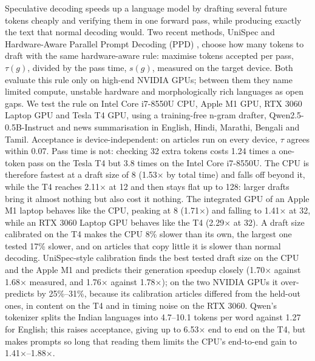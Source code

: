 \documentclass[11pt,a4paper]{article}
\begin{document}
\begin{titlepage}
\begin{minipage}{0.86\linewidth}
Speculative decoding speeds up a language model by drafting several future tokens cheaply and verifying them in one forward pass, while producing exactly the text that normal decoding would. Two recent methods, UniSpec \cite{unispec} and Hardware-Aware Parallel Prompt Decoding (PPD) \cite{ppd}, choose how many tokens to draft with the same hardware-aware rule: maximise tokens accepted per pass, $\tau(g)$, divided by the pass time, $s(g)$, measured on the target device. Both evaluate this rule only on high-end NVIDIA GPUs; between them they name limited compute, unstable hardware and morphologically rich languages as open gaps. We test the rule on Intel Core i7-8550U CPU, Apple M1 GPU, RTX 3060 Laptop GPU and Tesla T4 GPU, using a training-free n-gram drafter, Qwen2.5-0.5B-Instruct and news summarisation in English, Hindi, Marathi, Bengali and Tamil. Acceptance is device-independent: on articles run on every device, $\tau$ agrees within 0.07. Pass time is not: checking 32 extra tokens costs 1.24 times a one-token pass on the Tesla T4 but 3.8 times on the Intel Core i7-8550U. The CPU is therefore fastest at a draft size of 8 (1.53$\times$ by total time) and falls off beyond it, while the T4 reaches 2.11$\times$ at 12 and then stays flat up to 128: larger drafts bring it almost nothing but also cost it nothing. The integrated GPU of an Apple M1 laptop behaves like the CPU, peaking at 8 (1.71$\times$) and falling to 1.41$\times$ at 32, while an RTX 3060 Laptop GPU behaves like the T4 (2.29$\times$ at 32). A draft size calibrated on the T4 makes the CPU 8\% slower than its own, the largest one tested 17\% slower, and on articles that copy little it is slower than normal decoding. UniSpec-style calibration finds the best tested draft size on the CPU and the Apple M1 and predicts their generation speedup closely (1.70$\times$ against 1.68$\times$ measured, and 1.76$\times$ against 1.78$\times$); on the two NVIDIA GPUs it over-predicts by 25\%--31\%, because its calibration articles differed from the held-out ones, in content on the T4 and in timing noise on the RTX 3060. Qwen's tokenizer splits the Indian languages into 4.7--10.1 tokens per word against 1.27 for English; this raises acceptance, giving up to 6.53$\times$ end to end on the T4, but makes prompts so long that reading them limits the CPU's end-to-end gain to 1.41$\times$--1.88$\times$.

\end{minipage}
\end{titlepage}
\tableofcontents
\newpage
{}
\end{document}
